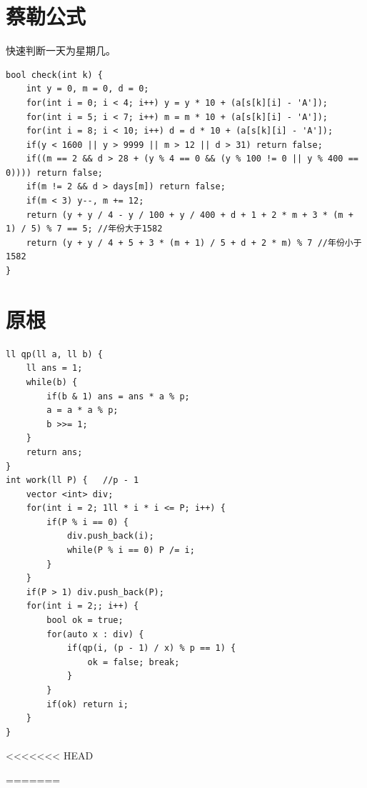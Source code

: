 \documentclass[a4paper,11pt,twoside,fontset = fandol,UTF8]{ctexbook} %
\begin{document}
	\section{蔡勒公式}
	快速判断一天为星期几。
	\begin{lstlisting}
bool check(int k) {
    int y = 0, m = 0, d = 0;
    for(int i = 0; i < 4; i++) y = y * 10 + (a[s[k][i] - 'A']);
    for(int i = 5; i < 7; i++) m = m * 10 + (a[s[k][i] - 'A']);
    for(int i = 8; i < 10; i++) d = d * 10 + (a[s[k][i] - 'A']);
    if(y < 1600 || y > 9999 || m > 12 || d > 31) return false;
    if((m == 2 && d > 28 + (y % 4 == 0 && (y % 100 != 0 || y % 400 == 0)))) return false;
    if(m != 2 && d > days[m]) return false;
    if(m < 3) y--, m += 12;
    return (y + y / 4 - y / 100 + y / 400 + d + 1 + 2 * m + 3 * (m + 1) / 5) % 7 == 5; //年份大于1582
	return (y + y / 4 + 5 + 3 * (m + 1) / 5 + d + 2 * m) % 7 //年份小于1582 
}
	\end{lstlisting}
	\section{原根}
	\begin{lstlisting}
ll qp(ll a, ll b) {
    ll ans = 1;
    while(b) {
        if(b & 1) ans = ans * a % p;
        a = a * a % p;
        b >>= 1;
    }
    return ans;
}
int work(ll P) {   //p - 1
    vector <int> div;
    for(int i = 2; 1ll * i * i <= P; i++) {
        if(P % i == 0) {
            div.push_back(i);
            while(P % i == 0) P /= i;
        }
    }
    if(P > 1) div.push_back(P);
    for(int i = 2;; i++) {
        bool ok = true;
        for(auto x : div) {
            if(qp(i, (p - 1) / x) % p == 1) {
                ok = false; break;
            }
        }
        if(ok) return i;
    }
} 
	\end{lstlisting}
<<<<<<< HEAD

=======
\end{document}
